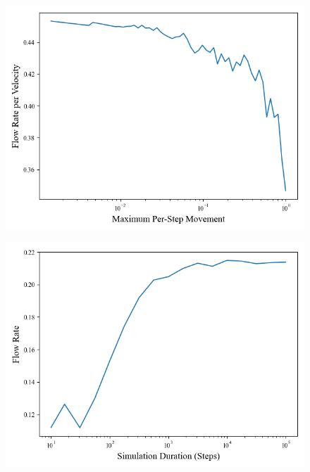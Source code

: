 \documentclass{article}
\begin{document}
\begin{figure}[H]
    \centering
    \begin{minipage}{.5\textwidth}
        \centering
        \includegraphics[width=.9\linewidth]{step_movement.png}
        \begin{minipage}{0.8\textwidth}
            \label{fig:step_movement}
        \end{minipage}
    \end{minipage}\hfill
    \begin{minipage}{.5\textwidth}
        \centering
        \includegraphics[width=1.\linewidth]{steps.png}
        \begin{minipage}{0.8\textwidth}
            \label{fig:steps}
        \end{minipage}
    \end{minipage}
\end{figure}
\end{document}

